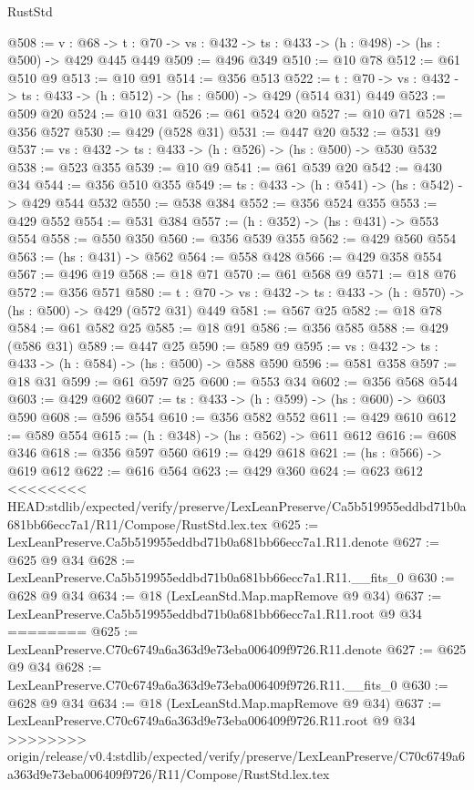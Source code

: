 \begin{lexlean}{RustStd}
\begin{coremodule}
{\begin{coremodule}
@508 := {v : @68} ->
  {t : @70} -> {vs : @432} -> {ts : @433} -> (h : @498) -> (hs : @500) -> @429 @445 @449
@509 := @496 @349
@510 := @10 @78
@512 := @61 @510 @9
@513 := @10 @91
@514 := @356 @513
@522 := {t : @70} -> {vs : @432} -> {ts : @433} -> (h : @512) -> (hs : @500) -> @429 (@514 @31) @449
@523 := @509 @20
@524 := @10 @31
@526 := @61 @524 @20
@527 := @10 @71
@528 := @356 @527
@530 := @429 (@528 @31)
@531 := @447 @20
@532 := @531 @9
@537 := {vs : @432} -> {ts : @433} -> (h : @526) -> (hs : @500) -> @530 @532
@538 := @523 @355
@539 := @10 @9
@541 := @61 @539 @20
@542 := @430 @34
@544 := @356 @510 @355
@549 := {ts : @433} -> (h : @541) -> (hs : @542) -> @429 @544 @532
@550 := @538 @384
@552 := @356 @524 @355
@553 := @429 @552
@554 := @531 @384
@557 := (h : @352) -> (hs : @431) -> @553 @554
@558 := @550 @350
@560 := @356 @539 @355
@562 := @429 @560 @554
@563 := (hs : @431) -> @562
@564 := @558 @428
@566 := @429 @358 @554
@567 := @496 @19
@568 := @18 @71
@570 := @61 @568 @9
@571 := @18 @76
@572 := @356 @571
@580 := {t : @70} -> {vs : @432} -> {ts : @433} -> (h : @570) -> (hs : @500) -> @429 (@572 @31) @449
@581 := @567 @25
@582 := @18 @78
@584 := @61 @582 @25
@585 := @18 @91
@586 := @356 @585
@588 := @429 (@586 @31)
@589 := @447 @25
@590 := @589 @9
@595 := {vs : @432} -> {ts : @433} -> (h : @584) -> (hs : @500) -> @588 @590
@596 := @581 @358
@597 := @18 @31
@599 := @61 @597 @25
@600 := @553 @34
@602 := @356 @568 @544
@603 := @429 @602
@607 := {ts : @433} -> (h : @599) -> (hs : @600) -> @603 @590
@608 := @596 @554
@610 := @356 @582 @552
@611 := @429 @610
@612 := @589 @554
@615 := (h : @348) -> (hs : @562) -> @611 @612
@616 := @608 @346
@618 := @356 @597 @560
@619 := @429 @618
@621 := (hs : @566) -> @619 @612
@622 := @616 @564
@623 := @429 @360
@624 := @623 @612
<<<<<<<< HEAD:stdlib/expected/verify/preserve/LexLeanPreserve/Ca5b519955eddbd71b0a681bb66ecc7a1/R11/Compose/RustStd.lex.tex
@625 := LexLeanPreserve.Ca5b519955eddbd71b0a681bb66ecc7a1.R11.denote
@627 := @625 @9 @34
@628 := LexLeanPreserve.Ca5b519955eddbd71b0a681bb66ecc7a1.R11.__fits_0
@630 := @628 @9 @34
@634 := @18 (LexLeanStd.Map.mapRemove @9 @34)
@637 := LexLeanPreserve.Ca5b519955eddbd71b0a681bb66ecc7a1.R11.root @9 @34
========
@625 := LexLeanPreserve.C70c6749a6a363d9e73eba006409f9726.R11.denote
@627 := @625 @9 @34
@628 := LexLeanPreserve.C70c6749a6a363d9e73eba006409f9726.R11.__fits_0
@630 := @628 @9 @34
@634 := @18 (LexLeanStd.Map.mapRemove @9 @34)
@637 := LexLeanPreserve.C70c6749a6a363d9e73eba006409f9726.R11.root @9 @34
>>>>>>>> origin/release/v0.4:stdlib/expected/verify/preserve/LexLeanPreserve/C70c6749a6a363d9e73eba006409f9726/R11/Compose/RustStd.lex.tex

\end{coremodule}}
\end{coremodule}
\end{lexlean}
